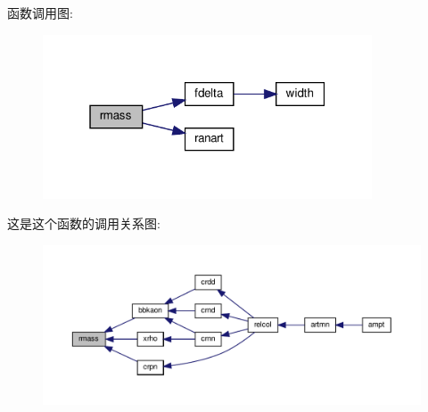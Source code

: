 函数调用图\+:
\nopagebreak
\begin{figure}[H]
\begin{center}
\leavevmode
\includegraphics[width=277pt]{rmass_8f90_a4e026f5a99eb3a89d08ad6c8064a8a61_cgraph}
\end{center}
\end{figure}
这是这个函数的调用关系图\+:
\nopagebreak
\begin{figure}[H]
\begin{center}
\leavevmode
\includegraphics[width=350pt]{rmass_8f90_a4e026f5a99eb3a89d08ad6c8064a8a61_icgraph}
\end{center}
\end{figure}
